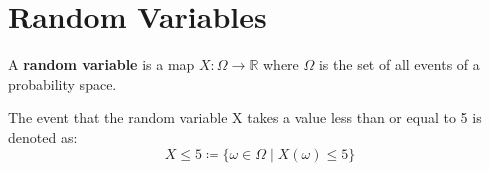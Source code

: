 \section{Random Variables}

\begin{definition}

    A \textbf{random variable } is a map $X: \Omega \to \mathbb{R}$ where $\Omega$ is the set of all events of
    a probability space.
    
\end{definition}

\begin{example}

    The event that the random variable X takes a value less than or equal to 5 is denoted as:
    $$X \leq 5 \coloneqq \{\omega \in \Omega \mid X(\omega) \leq 5\}$$
    
\end{example}

